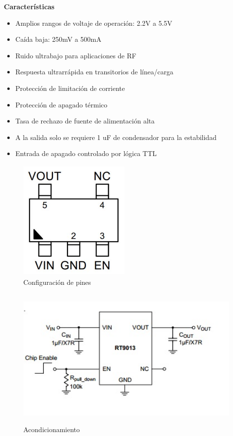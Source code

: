 \textbf{Características}

\begin{itemize}
    \item Amplios rangos de voltaje de operación: 2.2V a 5.5V
    \item Caída baja: 250mV a 500mA
    \item Ruido ultrabajo para aplicaciones de RF
    \item Respuesta ultrarrápida en transitorios de línea/carga
    \item Protección de limitación de corriente
    \item Protección de apagado térmico
    \item Tasa de rechazo de fuente de alimentación alta
    \item A la salida solo se requiere 1 uF de condensador para la estabilidad
    \item Entrada de apagado controlado por lógica TTL
\end{itemize}

\vspace{1cm}

\begin{figure}[H]
    \centering
    \includegraphics[width=5.5cm, height=6cm]{imagenes/esquematico RT9013.pdf}
    \caption{Configuración de pines}
    \label{imag:pines_RT9013}
\end{figure}

\begin{figure}[H]
    \centering
    \includegraphics[width=12cm, height=7cm]{imagenes/acondicionamiento RT9013.jpg}
    \caption{Acondicionamiento}
    \label{imag:acondicionamiento_RT9013}
\end{figure}

